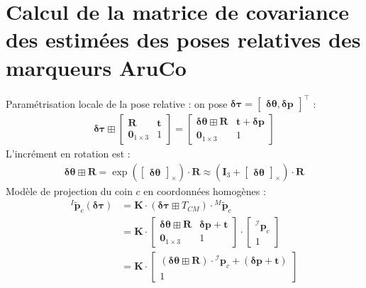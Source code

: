 \documentclass[a4paper]{article}
\begin{document}
\section{Calcul de la matrice de covariance des estimées des poses relatives des marqueurs AruCo}

\noindent Paramétrisation locale de la pose relative : on pose $\bm{\delta\tau} = \begin{bmatrix} \bm{\delta\theta}, \bm{\delta{p}} \end{bmatrix}^{\top}$ :
\begin{align}
\bm{\delta\tau} \boxplus \begin{bmatrix} \bm{R} & \bm{t} \\ \bm{0}_{1\times{3}} & 1 \end{bmatrix} =
\begin{bmatrix} \bm{\delta\theta} \boxplus \bm{R} & \bm{t} + \bm{\delta{p}} \\ \bm{0}_{1\times{3}} & 1 \end{bmatrix}
\end{align}
L'incrément en rotation est :
\begin{align}
\bm{\delta\theta} \boxplus \bm{R} = \exp\left(\begin{bmatrix}\bm{\delta\theta}\end{bmatrix}_{\times}\right) \cdot \bm{R}
\approx \left( \bm{I}_3 + \begin{bmatrix} \bm{\delta\theta} \end{bmatrix}_{\times} \right) \cdot \bm{R}
\end{align}
Modèle de projection du coin $c$ en coordonnées homogènes :
\begin{align}
{}^I\tilde{\bm{p}}_c(\bm{\delta\tau}) &= \bm{K} \cdot \left( \bm{\delta\tau} \boxplus T_{CM} \right) 
\cdot {}^M\tilde{\bm{p}}_c\\
&= \bm{K} \cdot \begin{bmatrix} \bm{\delta\theta} \boxplus \bm{R} & 
\bm{\delta{p}} + \bm{t} \\ \bm{0}_{1\times{3}} & 1 \end{bmatrix} \cdot \begin{bmatrix} 
{}^{\mathcal{I}}\bm{p}_c \\ 1 \end{bmatrix}\\
&= \bm{K} \cdot \begin{bmatrix} \left( \bm{\delta\theta} \boxplus \bm{R} \right) \cdot
{}^{\mathcal{I}}\bm{p}_c + (\bm{\delta{p}} + \bm{t}) \\ 1 \end{bmatrix}
\end{align}
\end{document}
